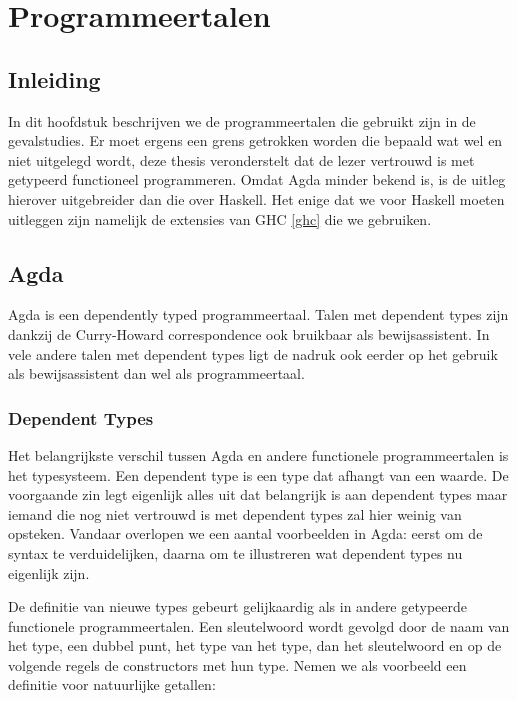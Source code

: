 \chapter{Programmeertalen}
\label{ch:agda-haskell}


\section{Inleiding}

In dit hoofdstuk beschrijven we de programmeertalen die gebruikt zijn in de
gevalstudies. Er moet ergens een grens getrokken worden die bepaald wat wel en
niet uitgelegd wordt, deze thesis veronderstelt dat de lezer vertrouwd is met
getypeerd functioneel programmeren.
Omdat Agda minder bekend is, is de uitleg hierover uitgebreider dan die over
Haskell. Het enige dat we voor Haskell moeten uitleggen zijn namelijk de
extensies van GHC \ref{ghc} die we gebruiken.


\section{Agda}

Agda is een dependently typed programmeertaal. Talen met dependent types zijn
dankzij de Curry-Howard correspondence ook bruikbaar als bewijsassistent. In
vele andere talen met dependent types ligt de nadruk ook eerder op het gebruik
als bewijsassistent dan wel als programmeertaal.

\subsection{Dependent Types}

Het belangrijkste verschil tussen Agda en andere functionele programmeertalen
is het typesysteem. Een dependent type is een type dat afhangt van een waarde.
De voorgaande zin legt eigenlijk alles uit dat belangrijk is aan dependent
types maar iemand die nog niet vertrouwd is met dependent types zal hier weinig
van opsteken. Vandaar overlopen we een aantal voorbeelden in Agda: eerst om de
syntax te verduidelijken, daarna om te illustreren wat dependent types nu
eigenlijk zijn.

De definitie van nieuwe types gebeurt gelijkaardig als in andere getypeerde
functionele programmeertalen. Een  sleutelwoord wordt gevolgd door
de naam van het type, een dubbel punt, het type van het type, dan het
sleutelwoord  en op de volgende regels de constructors met hun
type. Nemen we als voorbeeld een definitie voor natuurlijke getallen:

